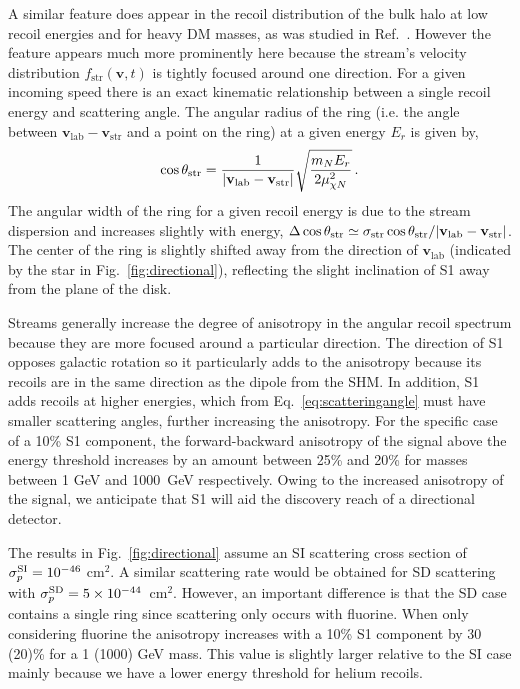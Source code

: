 \documentclass[prd,10pt,twocolumn,showpacs,nofootinbib,aps,superscriptaddress,preprintnumbers]{revtex4-1}
\newcommand{\vstr}{\mathbf{v}_\mathrm{str}}
\newcommand{\vlab}{\mathbf{v}_\mathrm{lab}}
\begin{document}
A similar feature does appear in the recoil distribution of the bulk halo at low recoil energies and for heavy DM masses, as was studied in Ref.~\cite{Bozorgnia:2011vc,Mayet:2016zxu}. However the feature appears much more prominently here because the stream's velocity distribution $f_{\mathrm{str}}(\mathbf{v},t)$ is tightly focused around one direction. For a given incoming speed there is an exact kinematic relationship between a single recoil energy and scattering angle. The angular radius of the ring (i.e. the angle between $\vlab-\vstr$ and a point on the ring) at a given energy $E_r$ is given by,
\begin{equation}\label{eq:scatteringangle}
\cos\theta_{\rm str} = \frac{1}{|\vlab - \vstr|}\sqrt{\frac{m_N E_r}{2 \mu_{\chi N}^2}} \, .
\end{equation}
The angular width of the ring for a given recoil energy is due to the stream dispersion and increases slightly with energy, $\Delta \cos{\theta_{\rm str}} \simeq \sigma_{\rm str}\cos{\theta_{\rm str}}/|\vlab - \vstr|$. The center of the ring is slightly shifted away from the direction of $\vlab$ (indicated by the star in Fig.~\ref{fig:directional}), reflecting the slight inclination of S1 away from the plane of the disk.

Streams generally increase the degree of anisotropy in the angular recoil spectrum because they are more focused around a particular direction. 
The direction of S1 opposes galactic rotation so it particularly adds to the anisotropy because its recoils are in the same direction as the dipole from the SHM.
In addition, S1 adds recoils at higher energies, which from Eq.~\eqref{eq:scatteringangle} must have smaller scattering angles, further increasing the anisotropy.
For the specific case of a 10\% S1 component, the forward-backward anisotropy of the signal above the energy threshold increases by an amount between 25\% and 20\% for masses between 1 GeV and 1000~GeV respectively. Owing to the increased anisotropy of the signal, we anticipate that S1 will aid the discovery reach of a directional detector. 

The results in Fig.~\ref{fig:directional} assume an SI scattering cross section of $\sigma^{\rm SI}_p = 10^{-46}$ cm$^2$. 
A similar scattering rate would be obtained for SD scattering with $\sigma_p^{\rm SD} = 5\times10^{-44}$~cm$^2$.
However, an important difference is that the SD case contains a single ring since scattering only occurs with fluorine. When only considering fluorine the anisotropy increases with a 10\% S1 component by 30 (20)\% for a 1 (1000) GeV mass. This value is slightly larger relative to the SI case mainly because we have a lower energy threshold for helium recoils.
\end{document}
